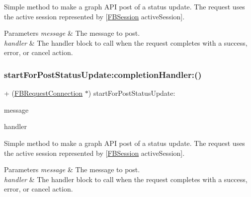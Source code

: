 Simple method to make a graph A\+PI post of a status update. The request uses the active session represented by {\ttfamily \mbox{[}\hyperlink{interfaceFBSession}{F\+B\+Session} active\+Session\mbox{]}}.


\begin{DoxyParams}{Parameters}
{\em message} & The message to post. \\
\hline
{\em handler} & The handler block to call when the request completes with a success, error, or cancel action. \\
\hline
\end{DoxyParams}
\mbox{\label{interfaceFBRequestConnection_a0dee12879e90db0c29e15916375c73b0}} 
\subsubsection{\texorpdfstring{start\+For\+Post\+Status\+Update\+:completion\+Handler\+:()}{startForPostStatusUpdate:completionHandler:()}\hspace{0.1cm}{\footnotesize\ttfamily [2/5]}}
{\footnotesize\ttfamily + (\hyperlink{interfaceFBRequestConnection}{F\+B\+Request\+Connection} $\ast$) start\+For\+Post\+Status\+Update\+: \begin{DoxyParamCaption}\item[{(N\+S\+String $\ast$)}]{message }\item[{completionHandler:(F\+B\+Request\+Handler)}]{handler }\end{DoxyParamCaption}}

Simple method to make a graph A\+PI post of a status update. The request uses the active session represented by {\ttfamily \mbox{[}\hyperlink{interfaceFBSession}{F\+B\+Session} active\+Session\mbox{]}}.


\begin{DoxyParams}{Parameters}
{\em message} & The message to post. \\
\hline
{\em handler} & The handler block to call when the request completes with a success, error, or cancel action. \\
\hline
\end{DoxyParams}
\mbox{\label{interfaceFBRequestConnection_a0dee12879e90db0c29e15916375c73b0}} 
